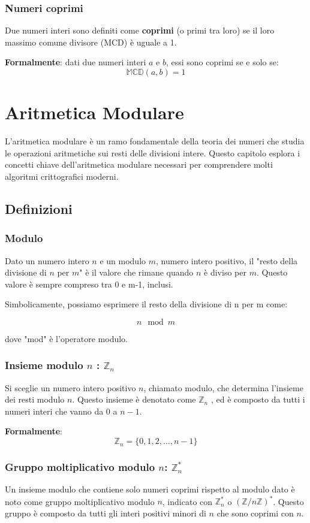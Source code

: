 \documentclass[a4paper,12pt]{report}
\begin{document}
\subsection*{Numeri coprimi}
Due numeri interi sono definiti come \textbf{coprimi} (o primi tra loro) se il loro massimo comune divisore (MCD) è uguale a 1. 

\textbf{Formalmente}: dati due numeri interi \(a\) e \(b\), essi sono coprimi se e solo se:
\[\mathbb{MCD}(a, b) = 1\]

\chapter{Aritmetica Modulare}

L'aritmetica modulare è un ramo fondamentale della teoria dei numeri che studia le operazioni aritmetiche sui resti delle divisioni intere. Questo capitolo esplora i concetti chiave dell'aritmetica modulare necessari per comprendere molti algoritmi crittografici moderni.

\section{Definizioni}
\subsection*{Modulo} 
Dato un numero intero $n$ e un modulo $m$, numero intero positivo, il "resto della divisione di $n$ per $m$" è il valore che rimane quando $n$ è diviso per $m$. Questo valore è sempre compreso tra 0 e m-1, inclusi.

Simbolicamente, possiamo esprimere il resto della divisione di n per m come:

\[ n \mod m \]

dove "mod" è l'operatore modulo.

\subsection*{Insieme modulo \(n\) : \(\mathbb{Z}_n\)}
Si sceglie un numero intero positivo \(n\), chiamato modulo, che determina l'insieme dei resti modulo \(n\). 
Questo insieme è denotato come \(\mathbb{Z}_n\)  , ed è composto da tutti i numeri interi che vanno da 0 a \(n-1\).

\textbf{Formalmente}: \[\mathbb{Z}_n = \{0, 1, 2, \ldots, n-1\}\]

\subsection*{Gruppo moltiplicativo modulo \(n\): \(\mathbb{Z}_n^*\)}
Un insieme modulo che contiene solo numeri coprimi rispetto al modulo dato è noto come gruppo moltiplicativo modulo \(n\), indicato con \(\mathbb{Z}_n^*\) o \((\mathbb{Z}/n\mathbb{Z})^*\). 
Questo gruppo è composto da tutti gli interi positivi minori di \(n\) che sono coprimi con \(n\).
\end{document}

